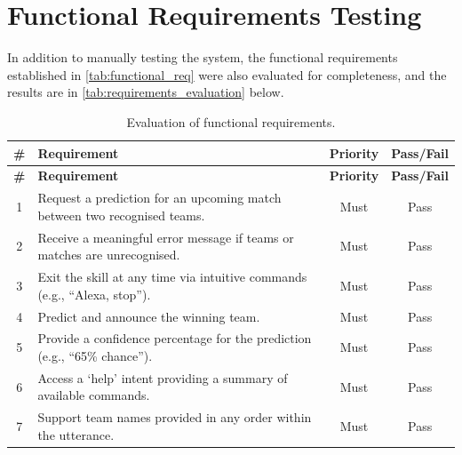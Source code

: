 \section{Functional Requirements Testing}
In addition to manually testing the system, the functional requirements established in \autoref{tab:functional_req} were also evaluated for completeness, and the results are in \autoref{tab:requirements_evaluation} below.
{\small
\begin{longtable}{@{} c >{\raggedright\arraybackslash}p{8.5cm} c c @{}}
    \caption{Evaluation of functional requirements.}
    \label{tab:requirements_evaluation} \\
    
    \toprule
    \textbf{\#} & \textbf{Requirement} & \textbf{Priority} & \textbf{Pass/Fail} \\
    \midrule
    \endfirsthead
    
    \toprule
    \textbf{\#} & \textbf{Requirement} & \textbf{Priority} & \textbf{Pass/Fail} \\
    \midrule
    \endhead
    
    \endfoot
    
    \bottomrule
    \endlastfoot
    
    1 & Request a prediction for an upcoming match between two recognised teams. & Must & Pass \\
    \midrule
    
    2 & Receive a meaningful error message if teams or matches are unrecognised. & Must & Pass \\
    \midrule
    
    3 & Exit the skill at any time via intuitive commands (e.g., ``Alexa, stop''). & Must & Pass \\
    \midrule
    
    4 & Predict and announce the winning team. & Must & Pass \\
    \midrule
    
    5 & Provide a confidence percentage for the prediction (e.g., ``65\% chance''). & Must & Pass \\
    \midrule
    
    6 & Access a `help' intent providing a summary of available commands. & Must & Pass \\
    \midrule
    
    7 & Support team names provided in any order within the utterance. & Must & Pass \\
    \midrule
    

\end{longtable}}

